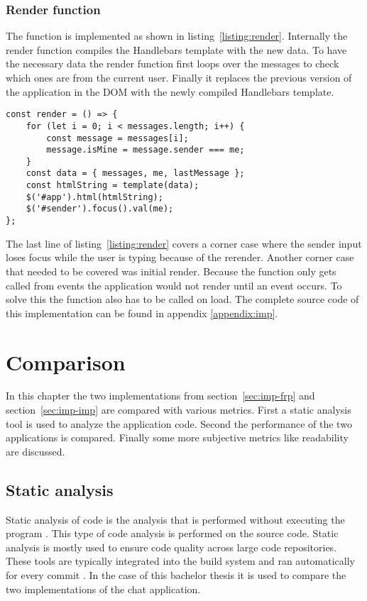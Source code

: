 \subsubsection{Render function}
The  function is implemented as shown in listing~\ref{listing:render}.
Internally the render function compiles the Handlebars template with the new data. To have the necessary data the render function first loops over the messages to check which ones are from the current user. Finally it replaces the previous version of the application in the DOM with the newly compiled Handlebars template.

\begin{lstlisting}[caption=Implementation of the render function,label=listing:render]
const render = () => {
	for (let i = 0; i < messages.length; i++) {
		const message = messages[i];
		message.isMine = message.sender === me;
	}
	const data = { messages, me, lastMessage };
	const htmlString = template(data);
	$('#app').html(htmlString);
	$('#sender').focus().val(me);
};
\end{lstlisting}

The last line of listing~\ref{listing:render} covers a corner case where the sender input loses focus while the user is typing because of the rerender. Another corner case that needed to be covered was initial render. Because the  function only gets called from events the application would not render until an event occurs. To solve this the  function also has to be called on load.  The complete source code of this implementation can be found in appendix \ref{appendix:imp}.

\section{Comparison}

In this chapter the two implementations from section~\ref{sec:imp-frp} and section~\ref{sec:imp-imp} are compared with various metrics. First a static analysis tool is used to analyze the application code. Second the performance of the two applications is compared. Finally some more subjective metrics like readability are discussed.

\subsection{Static analysis}
\label{sec:analysis}

Static analysis of code is the analysis that is performed without executing the program \cite{static}. This type of code analysis is performed on the source code. Static analysis is mostly used to ensure code quality across large code repositories. These tools are typically integrated into the build system and ran automatically for every commit \cite{static}. In the case of this bachelor thesis it is used to compare the two implementations of the chat application.

